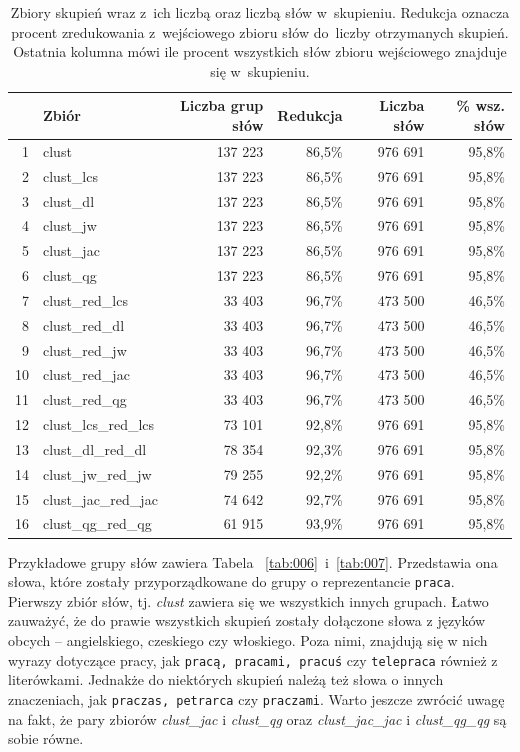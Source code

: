 \documentclass{praca1}
\begin{document}
\begin{table}[!h]
\centering
\caption{Zbiory skupień wraz z~ich liczbą oraz liczbą słów w~skupieniu. Redukcja oznacza procent zredukowania z~wejściowego zbioru słów do~liczby otrzymanych skupień. Ostatnia kolumna mówi ile procent wszystkich słów zbioru wejściowego znajduje się w~skupieniu.}
\begin{tabular}{|rl|rr|rr|}
  \hline
 & Zbiór & Liczba grup słów & Redukcja & Liczba słów & \% wsz. słów \\ 
  \hline
1 & clust & 137 223 & 86,5\% & 976 691 & 95,8\% \\ 
  2 & clust\_lcs & 137 223 & 86,5\% & 976 691 & 95,8\% \\ 
  3 & clust\_dl & 137 223 & 86,5\% & 976 691 & 95,8\% \\ 
  4 & clust\_jw & 137 223 & 86,5\% & 976 691 & 95,8\% \\ 
  5 & clust\_jac & 137 223 & 86,5\% & 976 691 & 95,8\% \\ 
  6 & clust\_qg & 137 223 & 86,5\% & 976 691 & 95,8\% \\ 
   \hline
7 & clust\_red\_lcs & 33 403 & 96,7\% & 473 500 & 46,5\% \\ 
  8 & clust\_red\_dl & 33 403 & 96,7\% & 473 500 & 46,5\% \\ 
  9 & clust\_red\_jw & 33 403 & 96,7\% & 473 500 & 46,5\% \\ 
  10 & clust\_red\_jac & 33 403 & 96,7\% & 473 500 & 46,5\% \\ 
  11 & clust\_red\_qg & 33 403 & 96,7\% & 473 500 & 46,5\% \\ 
   \hline
12 & clust\_lcs\_red\_lcs & 73 101 & 92,8\% & 976 691 & 95,8\% \\ 
  13 & clust\_dl\_red\_dl & 78 354 & 92,3\% & 976 691 & 95,8\% \\ 
  14 & clust\_jw\_red\_jw & 79 255 & 92,2\% & 976 691 & 95,8\% \\ 
  15 & clust\_jac\_red\_jac & 74 642 & 92,7\% & 976 691 & 95,8\% \\ 
  16 & clust\_qg\_red\_qg & 61 915 & 93,9\% & 976 691 & 95,8\% \\ 
   \hline
\end{tabular}
\label{tab:005}
\end{table}

Przykładowe grupy słów zawiera Tabela ~\ref{tab:006}~i~\ref{tab:007}. Przedstawia ona słowa, które zostały przyporządkowane do grupy o reprezentancie \verb|praca|. Pierwszy zbiór słów, tj. \emph{clust} zawiera się we wszystkich innych grupach. Łatwo zauważyć, że do prawie wszystkich skupień zostały dołączone słowa z języków obcych -- angielskiego, czeskiego czy włoskiego. Poza nimi, znajdują się w nich wyrazy dotyczące pracy, jak \verb|pracą, pracami, pracuś| czy \verb|telepraca| również z literówkami. Jednakże do niektórych skupień należą też słowa o innych znaczeniach, jak \verb|praczas, petrarca| czy \verb|praczami|. Warto jeszcze zwrócić uwagę na fakt, że pary zbiorów \emph{clust\_jac} i \emph{clust\_qg} oraz \emph{clust\_jac\_jac} i \emph{clust\_qg\_qg} są sobie równe.
\end{document}
